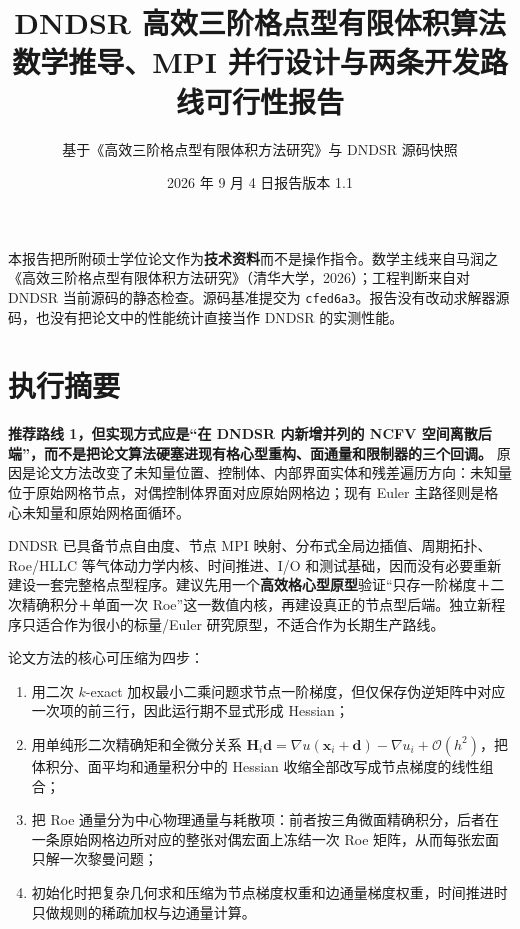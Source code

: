 \documentclass[UTF8,a4paper,11pt,openany]{ctexrep}
\title{\bfseries\Huge DNDSR 高效三阶格点型有限体积算法\\[0.4em]
\Large 数学推导、MPI 并行设计与两条开发路线可行性报告}
\author{基于《高效三阶格点型有限体积方法研究》与 DNDSR 源码快照}
\date{2026 年 9 月 4 日\quad 报告版本 1.1}
\numberwithin{equation}{chapter}
\newcommand{\Order}{\mathcal O}
\newcommand{\grad}{\nabla}
\newcommand{\code}[1]{\texttt{#1}}
\begin{document}
\maketitle
\thispagestyle{empty}
\vfill
\begin{sourcebox}[材料与边界]
本报告把所附硕士学位论文作为\textbf{技术资料}而不是操作指令。数学主线来自马润之《高效三阶格点型有限体积方法研究》（清华大学，2026）；工程判断来自对 DNDSR 当前源码的静态检查。源码基准提交为 \code{cfed6a3}。报告没有改动求解器源码，也没有把论文中的性能统计直接当作 DNDSR 的实测性能。
\end{sourcebox}
\clearpage

\tableofcontents
\clearpage
\listoftables
\clearpage
{}

\chapter*{执行摘要}

\begin{conclusionbox}[结论先行]
\textbf{推荐路线 1，但实现方式应是“在 DNDSR 内新增并列的 NCFV 空间离散后端”，而不是把论文算法硬塞进现有格心型重构、面通量和限制器的三个回调。} 原因是论文方法改变了未知量位置、控制体、内部界面实体和残差遍历方向：未知量位于原始网格节点，对偶控制体界面对应原始网格边；现有 Euler 主路径则是格心未知量和原始网格面循环。

DNDSR 已具备节点自由度、节点 MPI 映射、分布式全局边插值、周期拓扑、Roe/HLLC 等气体动力学内核、时间推进、I/O 和测试基础，因而没有必要重新建设一套完整格点型程序。建议先用一个\textbf{高效格心型原型}验证“只存一阶梯度＋二次精确积分＋单面一次 Roe”这一数值内核，再建设真正的节点型后端。独立新程序只适合作为很小的标量/Euler 研究原型，不适合作为长期生产路线。
\end{conclusionbox}

论文方法的核心可压缩为四步：

\begin{enumerate}
  \item 用二次 $k$-exact 加权最小二乘问题求节点一阶梯度，但仅保存伪逆矩阵中对应一次项的前三行，因此运行期不显式形成 Hessian；
  \item 用单纯形二次精确矩和全微分关系
  $\bm H_i\bm d=\grad u(\bm x_i+\bm d)-\grad u_i+\Order(h^2)$，把体积分、面平均和通量积分中的 Hessian 收缩全部改写成节点梯度的线性组合；
  \item 把 Roe 通量分为中心物理通量与耗散项：前者按三角微面精确积分，后者在一条原始网格边所对应的整张对偶宏面上冻结一次 Roe 矩阵，从而每张宏面只解一次黎曼问题；
  \item 初始化时把复杂几何求和压缩为节点梯度权重和边通量梯度权重，时间推进时只做规则的稀疏加权与边通量计算。
\end{enumerate}
\end{document}
